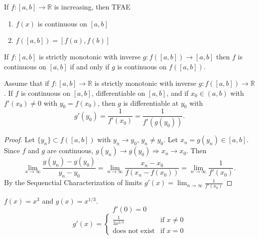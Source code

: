 
\begin{thm}
If $f\colon [a,b]\to \mathbb{R}$ is increasing, then TFAE
\begin{enumerate}
\item $f(x)$ is continuous on $[a,b]$
\item $f([a,b]) = [f(a),f(b)]$
\end{enumerate}
\end{thm}

\begin{cor}
If $f\colon [a,b]$ is strictly monotonic with inverse $g\colon f([a,b])\to [a,b]$ then $f$ is continuous on $[a,b]$ if and only if $g$ is continuous on $f([a,b])$.
\end{cor}

\begin{thm}
Assume that if $f\colon [a,b] \to\mathbb{R}$ is strictly monotonic with inverse $g\colon f([a,b])\to \mathbb{R}$. If $f$ is continuous on $[a,b]$, differentiable on $[a,b]$, and if $x_0\in (a,b)$ with $f'(x_0)\neq 0$ with $y_0 = f(x_0)$, then $g$ is differentiable at $y_0$ with \[g'(y_0) = \frac{1}{f'(x_0)} = \frac{1}{f'(g(y_0))}.\]
\end{thm}

\begin{proof}
Let $\{y_n\} \subset f([a,b])$ with $y_n\to y_0$, $y_n\neq y_0$. Let $x_n = g(y_n) \in [a,b]$. Since $f$ and $g$ are continuous, $g(y_n) \to g(y_0) \Rightarrow x_n \to x_0$. Then \[\lim_{x\to \infty} \frac{g(y_n)-g(y_0)}{y_n - y_0} = \lim_{n\to\infty} \frac{x_n - x_0}{f(x_n - f(x_0))} = \lim_{n\to\infty} \frac{1}{f'(x_0)}.\] By the Sequenctial Characterization of limits $g'(x) = \lim_{n\to\infty} \frac{1}{f'(x_0)}$
\end{proof}

\begin{exmp}
$f(x) = x^3$ and $g(x) = x^{1/3}$. \[f'(0) = 0\] \[g'(x) = \begin{cases}\frac{1}{3x^{2/3}} & \text{if }x\neq 0 \\ \text{does not exist} & \text{if } x=0 \end{cases}\]
\end{exmp}

